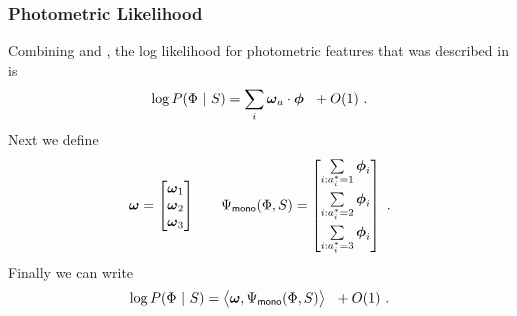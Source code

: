 \subsubsection{Photometric Likelihood}
Combining  and ,
the log likelihood for photometric features that was described in
 is
\begin{equation}
  \log P(\Features ~|~ \Seam) 
  =
  \sum_i \PixelModel_\Orient \cdot \Feature ~~ + O(1) ~.
\end{equation}
Next we define
\begin{align}
  \PixelModel =
  \begin{bmatrix}
    \PixelModel_1 \\
    \PixelModel_2 \\
    \PixelModel_3
  \end{bmatrix}
  & \quad &  
  \JointFtr_{\textsf{mono}}(\Features,\Seam) =
  \begin{bmatrix}
    \sum_{i:\PredictedOrient_i=1}\limits \Feature_i \vspace{1mm} \\
    \sum_{i:\PredictedOrient_i=2}\limits \Feature_i \vspace{1mm} \\
    \sum_{i:\PredictedOrient_i=3}\limits \Feature_i
  \end{bmatrix}~.
\end{align}
Finally we can write
\begin{equation}
  \label{eq:linear-photometric-model}
  \log P(\Features ~|~ \Seam) 
  =
  \bigl\langle \PixelModel, \JointFtr_{\textsf{mono}}(\Features,\Seam)
  \bigr\rangle ~~ + O(1) ~.
\end{equation}


